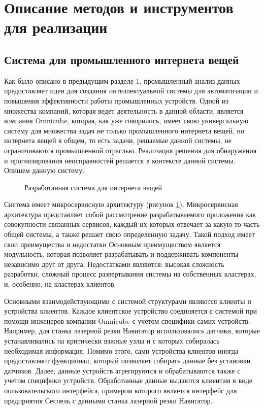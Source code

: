\section{Описание методов и инструментов для реализации}

\subsection{Система для промышленного интернета вещей}

Как было описано в предыдущим разделе 1,
промышленный анализ данных предоставляет идеи для создания
интеллектуальной системы для автоматизации и повышения
эффективности работы промышленных устройств.
Одной из множества компаний, которая ведет деятельность в данной области,
является компания Omnicube, которая, как уже говорилось,
имеет свою универсальную систему для множества
задач не только промышленного интернета вещей,
но интернета вещей в общем, то есть задачи,
решаемые данной системы, не ограничиваются промышленной отраслью.
Реализация решения для обнаружения и прогнозирования
неисправностей решается в контексте данной системы.
Опишем данную систему.

\begin{figure}[h]
    \caption{Разработанная система для интернета вещей}
    \label{sys2}
\end{figure}

Система имеет микросервисную архитектуру (рисунок \ref{sys2}).
Микросервисная архитектура представляет собой рассмотрение
разрабатываемого приложения как совокупности связанных сервисов,
каждый их которых отвечает за какую-то часть общей системы,
а также решает свою определенную задачу.
Такой подход имеет свои преимущества и недостатки
Основным преимуществом является модульность,
которая позволяет разрабатывать и поддерживать
компоненты независимо друг от друга.
Недостатками являются:
высокая сложность разработки,
сложный процесс развертывания системы
на собственных кластерах,
и, особенно, на кластерах клиентов.

Основными взаимодействующими с системой структурами являются клиенты и устройства клиентов.
Каждое клиентское устройство соединяется с системой при помощи инженеров компании Omnicube
с учетом специфики самих устройств. Например, для станка лазерной резки Навигатор
использовались датчики, которые устанавливались на критически важные узлы и с которых собиралась необходимая информация.
Помимо этого, сами устройства клиентов иногда предоставляют функционал, который позволяет собирать данные без установки датчиков.
Далее, данные устройств агрегируются и обрабатываются также с учетом специфики устройств.
Обработанные данные выдаются клиентам в виде пользовательского интерфейса, примером которого является
интерфейс для предприятия Сеспель с данными станка лазерной резки Навигатор.

